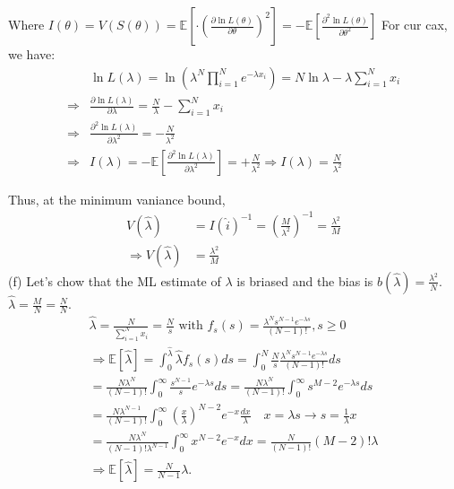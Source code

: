 \documentclass[12pt,a4paper]{article}
\begin{document}
Where $I(\theta)=V(S(\theta))=\mathbb{E}\left[\cdot\left(\frac{\partial \ln L(\theta)}{\partial \theta}\right)^{2}\right]=-\mathbb{E}\left[\frac{\partial^{2} \ln L(\theta)}{\partial \theta^{2}}\right]$
For cur cax, we have:
$$\begin{aligned}
& \ln L(\lambda)=\ln \left(\lambda^{N} \prod_{i=1}^{N} e^{-\lambda x_{i}}\right)=N \ln \lambda-\lambda \sum_{i=1}^{N} x_{i} \\
\Rightarrow & \frac{\partial \ln L(\lambda)}{\partial \lambda}=\frac{N}{\lambda}-\sum_{i=1}^{N} x_{i} \\
\Rightarrow & \frac{\partial^{2} \ln L(\lambda)}{\partial \lambda^{2}}=-\frac{N}{\lambda^{2}} \\
\Rightarrow & I(\lambda)=-\mathbb{E}\left[\frac{\partial^{2} \ln L(\lambda)}{\partial \lambda^{2}}\right]=+\frac{N}{\lambda^{2}} \Rightarrow I(\lambda)=\frac{N}{\lambda^{2}}
\end{aligned}$$

Thus, at the minimum vaniance bound,
$$\begin{aligned}
V(\hat{\lambda}) & =I(\hat{i})^{-1}=\left(\frac{M}{\lambda^{2}}\right)^{-1}=\frac{\lambda^{2}}{M} \\
\Rightarrow V(\hat{\lambda}) & =\frac{\lambda^{2}}{M}
\end{aligned}$$
(f) Let's chow that the ML estimate of $\lambda$ is briased and the bias is $b(\hat{\lambda})=\frac{\lambda^{2}}{N}$.
$\hat{\lambda}=\frac{M}{N}=\frac{N}{N}$.
$$\begin{array}{l} 
\hat{\lambda}=\frac{N}{\sum_{i=1}^{N} x_{i}}=\frac{N}{s} \text { with } f_{s}(s)=\frac{\lambda^{N} s^{N-1} e^{-\lambda s}}{(N-1)!}, s \geqslant 0 \\
\Rightarrow \mathbb{E}[\hat{\lambda}]=\int_{0}^{\hat{\lambda}} \hat{\lambda} f_{s}(s) d s=\int_{0}^{N} \frac{N}{s} \frac{\lambda^{N} s^{N-1} e^{-\lambda s}}{(N-1)!} d s \\
=\frac{N \lambda^{N}}{(N-1)!} \int_{0}^{\infty} \frac{s^{N-1}}{s} e^{-\lambda s} d s=\frac{N \lambda^{N}}{(N-1)!} \int_{0}^{\infty} s^{M-2} e^{-\lambda s} d s \\
=\frac{N \lambda^{N-1}}{(N-1)!} \int_{0}^{\infty}\left(\frac{x}{\lambda}\right)^{N-2} e^{-x} \frac{d x}{\lambda} \quad x=\lambda s \rightarrow s=\frac{1}{\lambda} x \\
=\frac{N \lambda^{N}}{(N-1)!\lambda^{N-1}} \int_{0}^{\infty} x^{N-2} e^{-x} d x=\frac{N}{(N-1)!}(M-2)!\lambda \\
\Rightarrow \mathbb{E}[\hat{\lambda}]=\frac{N}{N-1} \lambda .
\end{array}$$
\end{document}
